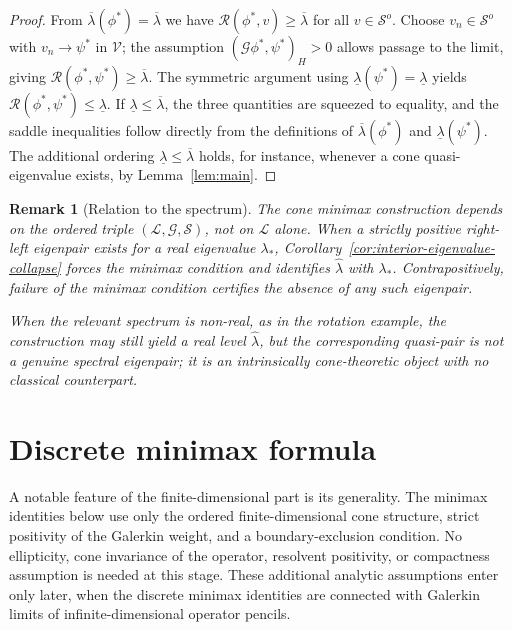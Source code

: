 \documentclass[10pt,a4paper]{amsart}
\newtheorem{remark}{Remark}
\begin{document}
\begin{proof}
	From $\overline{\lambda}(\phi^{*})=\overline{\lambda}$ we have
	$\mathcal{R}(\phi^{*},v)\geq\overline{\lambda}$ for all $v\in\mathcal{S}^{o}$.
	Choose $v_{n}\in\mathcal{S}^{o}$ with $v_{n}\to\psi^{*}$ in $\mathcal{V}$;
	the assumption $(\mathcal{G}\phi^{*},\psi^{*})_{H}>0$ allows passage to the
	limit, giving $\mathcal{R}(\phi^{*},\psi^{*})\geq\overline{\lambda}$.
	The symmetric argument using $\underline{\lambda}(\psi^{*})=\underline{\lambda}$
	yields $\mathcal{R}(\phi^{*},\psi^{*})\leq\underline{\lambda}$.
	If $\underline{\lambda}\leq\overline{\lambda}$, the three quantities are
	squeezed to equality, and the saddle inequalities follow directly from the
	definitions of $\overline{\lambda}(\phi^{*})$ and
	$\underline{\lambda}(\psi^{*})$. The additional ordering
	$\underline{\lambda}\leq\overline{\lambda}$ holds, for instance, whenever a
	cone quasi-eigenvalue exists, by Lemma~\ref{lem:main}.
\end{proof}

\begin{remark}[Relation to the spectrum]
	The cone minimax construction depends on the ordered triple
	$(\mathcal{L},\mathcal{G},\mathcal{S})$, not on $\mathcal{L}$ alone. When a
	strictly positive right-left eigenpair exists for a real eigenvalue
	$\lambda_{*}$, Corollary~\ref{cor:interior-eigenvalue-collapse} forces the
	minimax condition and identifies $\hat\lambda$ with $\lambda_{*}$.
	Contrapositively, failure of the minimax condition certifies the absence of
	any such eigenpair.
	
	When the relevant spectrum is non-real, as in the rotation example, the
	construction may still yield a real level $\hat\lambda$, but the corresponding
	quasi-pair is not a genuine spectral eigenpair; it is an intrinsically
	cone-theoretic object with no classical counterpart.
\end{remark}


\section{Discrete minimax formula}
\label{sec:approximation}

A notable feature of the finite-dimensional part is its generality. The
minimax identities below use only the ordered finite-dimensional cone
structure, strict positivity of the Galerkin weight, and a boundary-exclusion
condition. No ellipticity, cone invariance of the operator, resolvent
positivity, or compactness assumption is needed at this stage. These
additional analytic assumptions enter only later, when the discrete
minimax identities are connected with Galerkin limits of infinite-dimensional
operator pencils.
\end{document}
